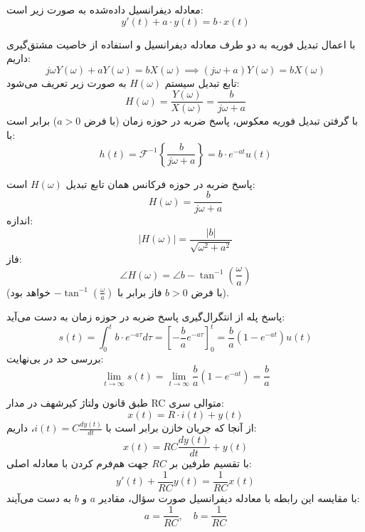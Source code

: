 معادله دیفرانسیل داده‌شده به صورت زیر است:
\begin{equation*}
y'(t) + a \cdot y(t) = b \cdot x(t)
\end{equation*}

با اعمال تبدیل فوریه به دو طرف معادله دیفرانسیل و استفاده از خاصیت مشتق‌گیری داریم:
\begin{equation*}
j\omega Y(\omega) + a Y(\omega) = b X(\omega) \implies (j\omega + a) Y(\omega) = b X(\omega)
\end{equation*}
تابع تبدیل سیستم $H(\omega)$ به صورت زیر تعریف می‌شود:
\begin{equation*}
H(\omega) = \frac{Y(\omega)}{X(\omega)} = \frac{b}{j\omega + a}
\end{equation*}
با گرفتن تبدیل فوریه معکوس، پاسخ ضربه در حوزه زمان (با فرض $a > 0$) برابر است با:
\begin{equation*}
h(t) = \mathcal{F}^{-1}\left\{ \frac{b}{j\omega + a} \right\} = b \cdot e^{-at} u(t)
\end{equation*}

پاسخ ضربه در حوزه فرکانس همان تابع تبدیل $H(\omega)$ است:
\begin{equation*}
H(\omega) = \frac{b}{j\omega + a}
\end{equation*}
 {اندازه:}
    \begin{equation*}
    |H(\omega)| = \frac{|b|}{\sqrt{\omega^2 + a^2}}
    \end{equation*}
    {فاز:}
    \begin{equation*}
    \angle H(\omega) = \angle b - \tan^{-1}\left(\frac{\omega}{a}\right)
    \end{equation*}
    (با فرض $b>0$ فاز برابر با $-\tan^{-1}(\frac{\omega}{a})$ خواهد بود).

پاسخ پله از انتگرال‌گیری پاسخ ضربه در حوزه زمان به دست می‌آید:
\begin{equation*}
s(t) = \int_{0}^{t} b \cdot e^{-a\tau} d\tau = \left[ -\frac{b}{a} e^{-a\tau} \right]_{0}^{t} = \frac{b}{a} \left(1 - e^{-at}\right) u(t)
\end{equation*}
بررسی حد در بی‌نهایت:
\begin{equation*}
\lim_{t \to \infty} s(t) = \lim_{t \to \infty} \frac{b}{a} \left(1 - e^{-at}\right) = \frac{b}{a}
\end{equation*}

طبق قانون ولتاژ کیرشهف در مدار RC متوالی سری:
\begin{equation*}
x(t) = R \cdot i(t) + y(t)
\end{equation*}
از آنجا که جریان خازن برابر است با $i(t) = C \frac{dy(t)}{dt}$، داریم:
\begin{equation*}
x(t) = RC \frac{dy(t)}{dt} + y(t)
\end{equation*}
با تقسیم طرفین بر $RC$ جهت هم‌فرم کردن با معادله اصلی:
\begin{equation*}
y'(t) + \frac{1}{RC} y(t) = \frac{1}{RC} x(t)
\end{equation*}
با مقایسه این رابطه با معادله دیفرانسیل صورت سؤال، مقادیر $a$ و $b$ به دست می‌آیند:
\begin{equation*}
a = \frac{1}{RC} , \quad b = \frac{1}{RC}
\end{equation*}
